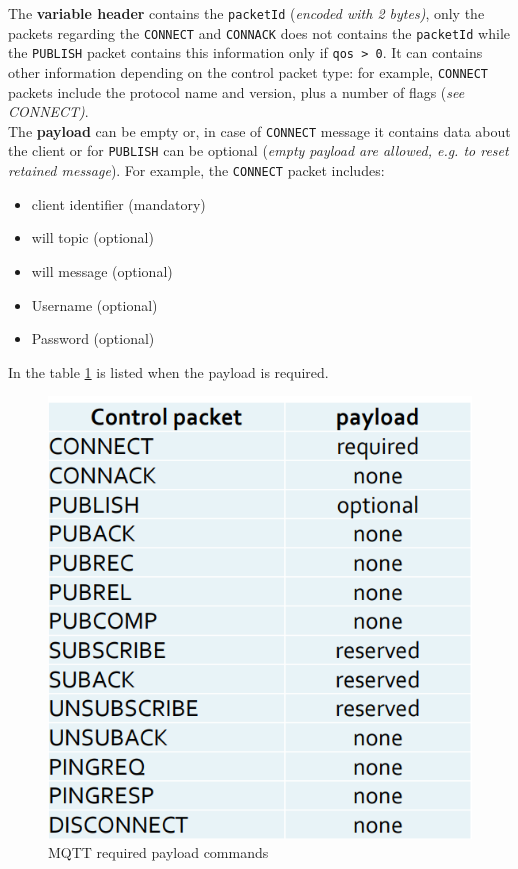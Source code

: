 \documentclass[10pt,a4paper]{report}
\theoremstyle{definition}
\begin{document}
The \textbf{variable header} contains the \texttt{packetId} (\textit{encoded with 2 bytes)}, only the packets regarding the \texttt{CONNECT} and \texttt{CONNACK} does not contains the \texttt{packetId} while the \texttt{PUBLISH} packet contains this information only if \texttt{qos > 0}. It can contains other information depending on the control packet type: for example, \texttt{CONNECT} packets include the protocol name and version, plus a number of flags (\textit{see CONNECT)}.\\
The \textbf{payload} can be empty or, in case of \texttt{CONNECT} message it contains data about the client or for \texttt{PUBLISH} can be optional (\textit{empty payload are allowed, e.g. to reset retained message}). For example, the \texttt{CONNECT} packet includes:
\begin{itemize}
	\item 
	client identifier (mandatory)
	\item 
	will topic (optional)
	\item 
	will message (optional)
	\item 
	Username (optional)
	\item 
	Password (optional)
	
	
\end{itemize}
In the table \ref{mqtt-req-data} is listed when the payload is required. 
\begin{figure}[h!]
	\centering\includegraphics[scale=0.40]{images/Pasted image 20230304102808.png}
	\caption{MQTT required payload commands}\label{mqtt-req-data}\end{figure}
\end{document}
